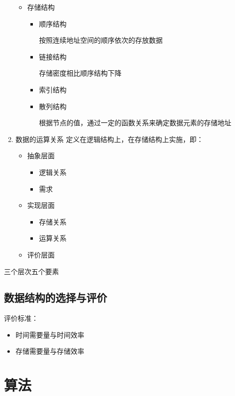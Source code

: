 \documentclass[AutoFakeBold]{LZUThesis2007}
\begin{document}
\begin{enumerate}
\begin{itemize}
	
				\item  存储结构
					\begin{itemize}
						\item  顺序结构
			
									按照连续地址空间的顺序依次的存放数据
			
						\item  链接结构

									存储密度相比顺序结构下降

						\item  索引结构
						\item  散列结构

									根据节点的值，通过一定的函数关系来确定数据元素的存储地址

					\end{itemize}
			\end{itemize}
	\item 数据的运算关系
				定义在逻辑结构上，在存储结构上实施，即：
				\begin{itemize}
					\item  抽象层面
						\begin{itemize}
							\item 逻辑关系
							\item 需求
						\end{itemize}
					\item  实现层面
						\begin{itemize}
							\item 存储关系
							\item 运算关系
						\end{itemize}
					\item  评价层面
				\end{itemize}
\end{enumerate}

三个层次五个要素

	\section{数据结构的选择与评价}
		评价标准：
			\begin{itemize}
				\item 时间需要量与时间效率
				\item 存储需要量与存储效率
			\end{itemize}

\chapter{算法}
\end{document}
